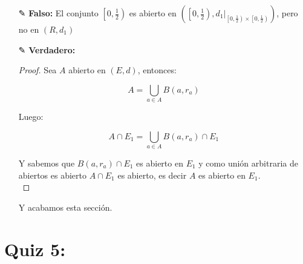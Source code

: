 \begin{itemize}[leftmargin=*]
\item[✎] \textbf{Falso: }El conjunto $\left[0, \frac{1}{2}\right)$ es abierto en $\left(\left[0, \frac{1}{2}\right),\left.d_1\right|_{\left[0, \frac{1}{2}\right) \times\left[0, \frac{1}{2}\right)}\right)$, pero no en $(R,d_1)$

\item[✎]\textbf{Verdadero: }\\
\begin{proof}
    Sea $A$ abierto en $(E,d)$, entonces:

    $$A=\bigcup_{a\in A} B(a,r_a)$$

    Luego:

    $$A\cap E_1=\bigcup_{a\in A} B(a,r_a)\cap E_1$$

Y sabemos que $B(a,r_a)\cap E_1$ es abierto en $E_1$ y como unión arbitraria de abiertos es abierto $A\cap E_1$ es abierto, es decir $A$ es abierto en $E_1$.\\
\end{proof}

Y acabamos esta sección.
\end{itemize}


\section{Quiz 5: }

